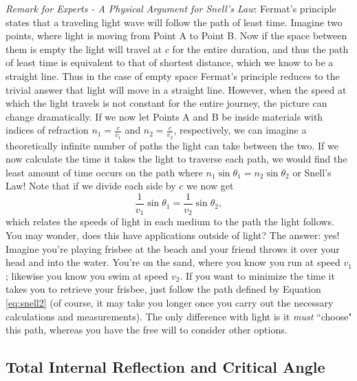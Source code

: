 \emph{Remark for Experts - A Physical Argument for Snell's Law}: Fermat's principle states that a traveling light wave will follow the path of least time.  Imagine two points, where light is moving from Point A to Point B.  Now if the space between them is empty the light will travel at $c$ for the entire duration, and thus the path of least time is equivalent to that of shortest distance, which we know to be a straight line.  Thus in the case of empty space Fermat's principle reduces to the trivial answer that light will move in a straight line.  However, when the speed at which the light travels is not constant for the entire journey, the picture can change dramatically.  If we now let Points A and B be inside materials with indices of refraction $n_{1} = \frac{c}{v_{1}}$ and $n_{2} = \frac{c}{v_{2}}$, respectively, we can imagine a theoretically infinite number of paths the light can take between the two.  If we now calculate the time it takes the light to traverse each path, we would find the least amount of time occurs on the path where $n_{1}\sin \theta _{1} = n_{2}\sin \theta _{2}$ or Snell's Law!  Note that if we divide each side by $c$ we now get
\begin{equation}
	\label{eq:snell2}
	\frac{1}{v_{1}}\sin \theta _{1} = \frac{1}{v_{2}}\sin \theta _{2},
\end{equation}
which relates the speeds of light in each medium to the path the light follows.  You may wonder, does this have applications outside of light?  The answer: yes!  Imagine you're playing frisbee at the beach and your friend throws it over your head and into the water.  You're on the sand, where you know you run at speed $v_{1}$; likewise you know you swim at speed $v_{2}$.  If you want to minimize the time it takes you to retrieve your frisbee, just follow the path defined by Equation \eqref{eq:snell2} (of course, it may take you longer once you carry out the necessary calculations and measurements).  The only difference with light is it \textit{must} ``choose" this path, whereas you have the free will to consider other options.

\subsection{Total Internal Reflection and Critical Angle}

